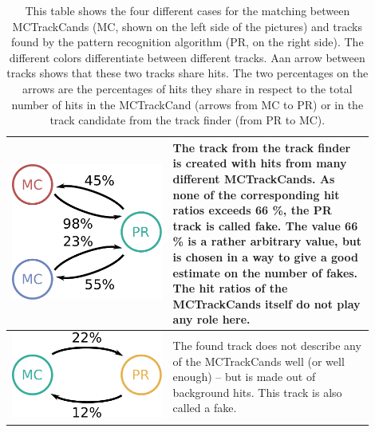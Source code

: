 \begin{table}
\begin{tabular}{m{0.4\linewidth}m{0.5\linewidth}}
    \centering \includegraphics[width=0.8\linewidth]{figures/theory/fom_fake.pdf} & The track from the track finder is created with hits from many different MCTrackCands. As none of the corresponding hit ratios exceeds 66 \%, the PR track is called fake. The value 66 \% is a rather arbitrary value, but is chosen in a way to give a good estimate on the number of fakes. The hit ratios of the MCTrackCands itself do not play any role here. \\  \midrule
    \centering \includegraphics[width=0.8\linewidth]{figures/theory/fom_background.pdf} & The found track does not describe any of the MCTrackCands well (or well enough) -- but is made out of background hits. This track is also called a fake. \\ \bottomrule
  \end{tabular}
  \caption[Matching routine for compiling the FOM.]{This table shows the four different cases for the matching between MCTrackCands (MC, shown on the left side of the pictures) and tracks found by the pattern recognition algorithm (PR, on the right side). The different colors differentiate between different tracks. Aan arrow between tracks shows that these two tracks share hits. The two percentages on the arrows are the percentages of hits they share in respect to the total number of hits in the MCTrackCand (arrows from MC to PR) or in the track candidate from the track finder (from PR to MC).}
  \label{tab-mc-track-finder}
\end{table}

